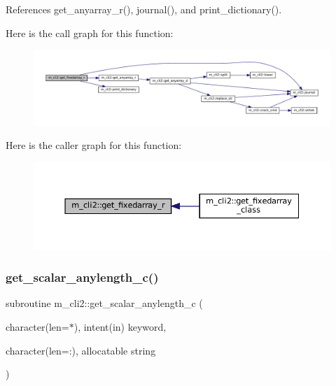 References get\+\_\+anyarray\+\_\+r(), journal(), and print\+\_\+dictionary().

Here is the call graph for this function\+:\nopagebreak
\begin{figure}[H]
\begin{center}
\leavevmode
\includegraphics[width=350pt]{namespacem__cli2_afbec790abad0dca990c0a61cd2d9e9ae_cgraph}
\end{center}
\end{figure}
Here is the caller graph for this function\+:\nopagebreak
\begin{figure}[H]
\begin{center}
\leavevmode
\includegraphics[width=350pt]{namespacem__cli2_afbec790abad0dca990c0a61cd2d9e9ae_icgraph}
\end{center}
\end{figure}
\mbox{\label{namespacem__cli2_a7429381c83a021ba3ffb32ed58e17a0e}} 
\subsubsection{\texorpdfstring{get\+\_\+scalar\+\_\+anylength\+\_\+c()}{get\_scalar\_anylength\_c()}}
{\footnotesize\ttfamily subroutine m\+\_\+cli2\+::get\+\_\+scalar\+\_\+anylength\+\_\+c (\begin{DoxyParamCaption}\item[{character(len=$\ast$), intent(in)}]{keyword,  }\item[{character(len=\+:), allocatable}]{string }\end{DoxyParamCaption})\hspace{0.3cm}{\ttfamily [private]}}



